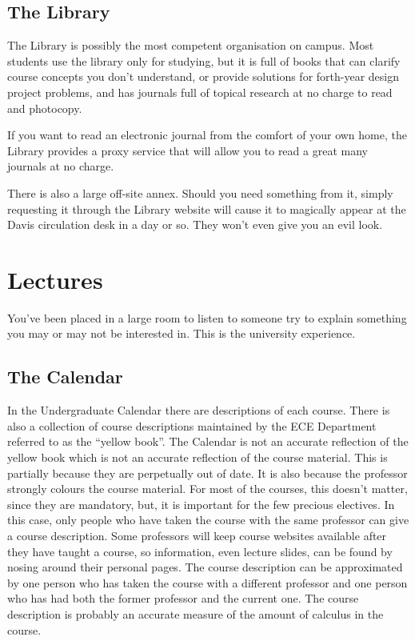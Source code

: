\documentclass{book}
\begin{document}
\section{The Library}
The Library is possibly the most competent organisation on campus. Most students use the library only for studying, but it is full of books that can clarify course concepts you don't understand, or provide solutions for forth-year design project problems, and has journals full of topical research at no charge to read and photocopy.

If you want to read an electronic journal from the comfort of your own home, the Library provides a proxy service that will allow you to read a great many journals at no charge.

There is also a large off-site annex. Should you need something from it, simply requesting it through the Library website will cause it to magically appear at the Davis circulation desk in a day or so. They won't even give you an evil look.

\chapter{Lectures}
You've been placed in a large room to listen to someone try to explain something you may or may not be interested in. This is the university experience.

\section{The Calendar}\label{sec:calendar}
In the Undergraduate Calendar there are descriptions of each course. There is also a collection of course descriptions maintained by the ECE Department referred to as the ``yellow book''. The Calendar is not an accurate reflection of the yellow book which is not an accurate reflection of the course material. This is partially because they are perpetually out of date. It is also because the professor strongly colours the course material. For most of the courses, this doesn't matter, since they are mandatory, but, it is important for the few precious electives. In this case, only people who have taken the course with the same professor can give a course description. Some professors will keep course websites available after they have taught a course, so information, even lecture slides, can be found by nosing around their personal pages. The course description can be approximated by one person who has taken the course with a different professor and one person who has had both the former professor and the current one. The course description is probably an accurate measure of the amount of calculus in the course.
\end{document}
